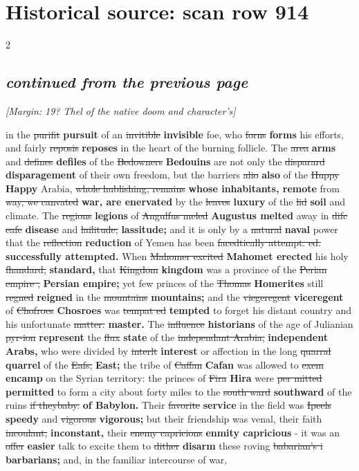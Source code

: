 \documentclass[10pt]{article}
\begin{document}
\section*{Historical source: scan row 914}
\begin{multicols}{2}
\subsection*{\textit{continued from the previous page}}
{\small\itshape [Margin: 19? Thel of the native doom and character’s]}\par
in the \sout{purifit} \textbf{pursuit} of an \sout{invitible} \textbf{invisible} foe, who \sout{forns} \textbf{forms} his efforts, and fairly \sout{reposis} \textbf{reposes} in the heart of the burning follicle. The \sout{area} \textbf{arms} and \sout{defines} \textbf{defiles} of the \sout{Bedowners} \textbf{Bedouins} are not only the \sout{disparard} \textbf{disparagement} of their own freedom, but the barriers \sout{alio} \textbf{also} of the \sout{Huppy} \textbf{Happy} Arabia, \sout{whole hublishing, remains} \textbf{whose inhabitants, remote} from \sout{way, we canvated} \textbf{war, are enervated} by the \sout{leaves} \textbf{luxury} of the \sout{lid} \textbf{soil} and climate. The \sout{regions} \textbf{legions} of \sout{Angulfus meled} \textbf{Augustus melted} away in \sout{difc eafe} \textbf{disease} and \sout{lailitude;} \textbf{lassitude;} and it is only by a \sout{natural} \textbf{naval} power that the \sout{reflection} \textbf{reduction} of Yemen has been \sout{facedtically attempt. ed.} \textbf{successfully attempted.} When \sout{Mahomer excited} \textbf{Mahomet erected} his holy \sout{fhandard,} \textbf{standard,} that \sout{Kingdom} \textbf{kingdom} was a province of the \sout{Perian empire ,} \textbf{Persian empire;} yet few princes of the \sout{Thomas} \textbf{Homerites} still \sout{regned} \textbf{reigned} in the \sout{mountains} \textbf{mountains;} and the \sout{viegeregent} \textbf{viceregent} of \sout{Chofroes} \textbf{Chosroes} was \sout{tempat ed} \textbf{tempted} to forget his distant country and his unfortunate \sout{matter.} \textbf{master.} The \sout{influence} \textbf{historians} of the age of Julianian \sout{pyr-ion} \textbf{represent} the \sout{flux} \textbf{state} of the \sout{independant Arabia,} \textbf{independent Arabs,} who were divided by \sout{interlt} \textbf{interest} or affection in the long \sout{quarral} \textbf{quarrel} of the \sout{Eafs,} \textbf{East;} the tribe of \sout{Caffan} \textbf{Cafan} was allowed to \sout{exem} \textbf{encamp} on the Syrian territory: the princes of \sout{Fira} \textbf{Hira} were \sout{per mitted} \textbf{permitted} to form a city about forty miles to the \sout{south ward} \textbf{southward} of the ruins \sout{if theybaby.} \textbf{of Babylon.} Their \sout{favorite} \textbf{service} in the field was \sout{Ipeels} \textbf{speedy} and \sout{vigorous} \textbf{vigorous;} but their friendship was venal, their faith \sout{incoulant,} \textbf{inconstant,} their \sout{enemy capricions} \textbf{enmity capricious} - it was an \sout{offer} \textbf{easier} talk to excite them to \sout{dither} \textbf{disarm} these roving \sout{babarian's i} \textbf{barbarians;} and, in the familiar intercourse of war, 
\end{multicols}
\end{document}
